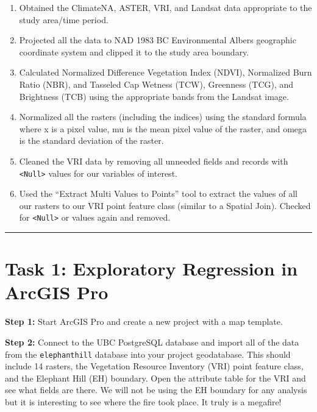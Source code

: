 \documentclass[
]{book}
\providecommand{\tightlist}{%
  \setlength{\itemsep}{0pt}\setlength{\parskip}{0pt}}
\begin{document}
\begin{enumerate}
\def\labelenumi{\arabic{enumi}.}
\tightlist
\item
  Obtained the ClimateNA, ASTER, VRI, and Landsat data appropriate to the study area/time period.
\item
  Projected all the data to NAD 1983 BC Environmental Albers geographic coordinate system and clipped it to the study area boundary.
\item
  Calculated Normalized Difference Vegetation Index (NDVI), Normalized Burn Ratio (NBR), and Tasseled Cap Wetness (TCW), Greenness (TCG), and Brightness (TCB) using the appropriate bands from the Landsat image.
\item
  Normalized all the rasters (including the indices) using the standard formula where x is a pixel value, mu is the mean pixel value of the raster, and omega is the standard deviation of the raster.
\item
  Cleaned the VRI data by removing all unneeded fields and records with \texttt{\textless{}Null\textgreater{}} values for our variables of interest.
\item
  Used the ``Extract Multi Values to Points'' tool to extract the values of all our rasters to our VRI point feature class (similar to a Spatial Join). Checked for \texttt{\textless{}Null\textgreater{}} or values again and removed.
\end{enumerate}

\begin{center}\rule{0.5\linewidth}{0.5pt}\end{center}

\hypertarget{task-1-exploratory-regression-in-arcgis-pro}{%
\section*{Task 1: Exploratory Regression in ArcGIS Pro}\label{task-1-exploratory-regression-in-arcgis-pro}}

\textbf{Step 1:} Start ArcGIS Pro and create a new project with a map template.

\textbf{Step 2:} Connect to the UBC PostgreSQL database and import all of the data from the \texttt{elephanthill} database into your project geodatabase. This should include 14 rasters, the Vegetation Resource Inventory (VRI) point feature class, and the Elephant Hill (EH) boundary. Open the attribute table for the VRI and see what fields are there. We will not be using the EH boundary for any analysis but it is interesting to see where the fire took place. It truly is a megafire!
\end{document}
